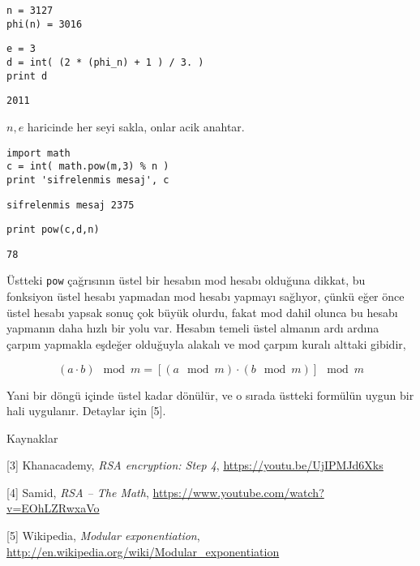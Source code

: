 \documentclass[12pt,fleqn]{article}\usepackage{../../common}
\begin{document}
\begin{verbatim}
n = 3127
phi(n) = 3016
\end{verbatim}

\begin{verbatim}
e = 3
d = int( (2 * (phi_n) + 1 ) / 3. )
print d
\end{verbatim}

\begin{verbatim}
2011
\end{verbatim}

$n,e$ haricinde her seyi sakla, onlar acik anahtar.

\begin{verbatim}
import math
c = int( math.pow(m,3) % n )
print 'sifrelenmis mesaj', c
\end{verbatim}

\begin{verbatim}
sifrelenmis mesaj 2375
\end{verbatim}

\begin{verbatim}
print pow(c,d,n)
\end{verbatim}

\begin{verbatim}
78
\end{verbatim}

Üstteki \verb!pow! çağrısının üstel bir hesabın mod hesabı olduğuna dikkat,
bu fonksiyon üstel hesabı yapmadan mod hesabı yapmayı sağlıyor, çünkü eğer
önce üstel hesabı yapsak sonuç çok büyük olurdu, fakat mod dahil olunca bu
hesabı yapmanın daha hızlı bir yolu var. Hesabın temeli üstel almanın ardı
ardına çarpım yapmakla eşdeğer olduğuyla alakalı ve mod çarpım kuralı
alttaki gibidir,

$$ 
(a \cdot b) \mod m = [(a \mod m) \cdot (b \mod m)] \mod m
$$

Yani bir döngü içinde üstel kadar dönülür, ve o sırada üstteki formülün
uygun bir hali uygulanır. Detaylar için [5]. 

Kaynaklar

[3] Khanacademy, {\em RSA encryption: Step 4}, \url{https://youtu.be/UjIPMJd6Xks}

[4] Samid, {\em RSA -- The Math}, \url{https://www.youtube.com/watch?v=EOhLZRwxaVo}

[5] Wikipedia, {\em Modular exponentiation}, \url{http://en.wikipedia.org/wiki/Modular_exponentiation}
\end{document}

